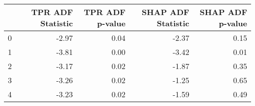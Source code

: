 \begin{tabular}{lrrrr}
\toprule
 & TPR ADF Statistic & TPR ADF p-value & SHAP ADF Statistic & SHAP ADF p-value \\
\midrule
0 & -2.97 & 0.04 & -2.37 & 0.15 \\
1 & -3.81 & 0.00 & -3.42 & 0.01 \\
2 & -3.17 & 0.02 & -1.87 & 0.35 \\
3 & -3.26 & 0.02 & -1.25 & 0.65 \\
4 & -3.23 & 0.02 & -1.59 & 0.49 \\
\bottomrule
\end{tabular}
